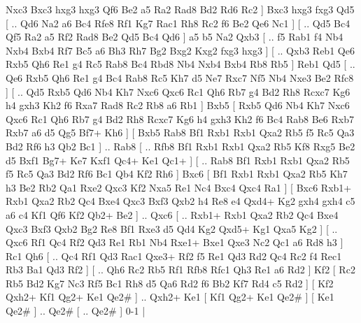 Nxc3  Bxc3 hxg3  hxg3 Qf6  Be2 a5  Ra2 Rad8  Bd2 Rd6  Rc2   ]  Bxc3   hxg3    fxg3   Qd5 [ .. Qd6  Na2 a6  Bc4 Rfe8  Rf1 Kg7  Rac1 Rh8  Rc2 f6  Be2 Qe6  Nc1   ]  [ .. Qd5  Bc4 Qf5  Ra2 a5  Rf2 Rad8  Be2 Qd5  Bc4 Qd6   ]  a5   b5    Na2   Qxb3 [ .. f5  Rab1 f4  Nb4 Nxb4  Bxb4 Rf7  Bc5 a6  Bh3 Rh7  Bg2 Bxg2  Kxg2 fxg3  hxg3   ]  [ .. Qxb3  Reb1 Qe6  Rxb5 Qh6  Re1 g4  Rc5 Rab8  Bc4 Rbd8  Nb4 Nxb4  Bxb4 Rb8  Rb5   ]  Reb1   Qd5 [ .. Qe6  Rxb5 Qh6  Re1 g4  Bc4 Rab8  Rc5 Kh7  d5 Ne7  Rxc7 Nf5  Nb4 Nxe3  Be2 Rfc8   ]  [ .. Qd5  Rxb5 Qd6  Nb4 Kh7  Nxc6 Qxc6  Rc1 Qh6  Rb7 g4  Bd2 Rh8  Rcxc7 Kg6  h4 gxh3  Kh2 f6  Rxa7 Rad8  Rc2 Rb8  a6 Rb1   ]  Bxb5 [  Rxb5 Qd6  Nb4 Kh7  Nxc6 Qxc6  Rc1 Qh6  Rb7 g4  Bd2 Rh8  Rcxc7 Kg6  h4 gxh3  Kh2 f6  Bc4 Rab8  Be6 Rxb7  Rxb7 a6  d5 Qg5  Bf7+ Kh6   ]  [  Bxb5 Rab8  Bf1 Rxb1  Rxb1 Qxa2  Rb5 f5  Rc5 Qa3  Bd2 Rf6  h3 Qb2  Bc1   ] .. Rab8 [ .. Rfb8  Bf1 Rxb1  Rxb1 Qxa2  Rb5 Kf8  Rxg5 Be2  d5 Bxf1  Bg7+ Ke7  Kxf1 Qc4+  Ke1 Qc1+   ]  [ .. Rab8  Bf1 Rxb1  Rxb1 Qxa2  Rb5 f5  Rc5 Qa3  Bd2 Rf6  Bc1 Qb4  Kf2 Rh6   ]  Bxc6 [  Bf1 Rxb1  Rxb1 Qxa2  Rb5 Kh7  h3 Be2  Rb2 Qa1  Rxe2 Qxc3  Kf2 Nxa5  Re1 Nc4  Bxc4 Qxc4  Ra1   ]  [  Bxc6 Rxb1+  Rxb1 Qxa2  Rb2 Qc4  Bxe4 Qxc3  Bxf3 Qxb2  h4 Re8  e4 Qxd4+  Kg2 gxh4  gxh4 c5  a6 c4  Kf1 Qf6  Kf2 Qb2+  Be2   ] .. Qxc6 [ .. Rxb1+  Rxb1 Qxa2  Rb2 Qc4  Bxe4 Qxc3  Bxf3 Qxb2  Bg2 Re8  Bf1 Rxe3  d5 Qd4  Kg2 Qxd5+  Kg1 Qxa5  Kg2   ]  [ .. Qxc6  Rf1 Qc4  Rf2 Qd3  Re1 Rb1  Nb4 Rxe1+  Bxe1 Qxe3  Nc2 Qc1  a6 Rd8  h3   ]  Rc1   Qh6 [ .. Qc4  Rf1 Qd3  Rac1 Qxe3+  Rf2 f5  Re1 Qd3  Rd2 Qc4  Rc2 f4  Rec1 Rb3  Ba1 Qd3  Rf2   ]  [ .. Qh6  Rc2 Rb5  Rf1 Rfb8  Rfc1 Qh3  Re1 a6  Rd2   ]  Kf2 [  Rc2 Rb5  Bd2 Kg7  Nc3 Rf5  Bc1 Rh8  d5 Qa6  Rd2 f6  Bb2 Kf7  Rd4 c5  Rd2   ]  [  Kf2 Qxh2+  Kf1 Qg2+  Ke1 Qe2#   ] .. Qxh2+    Ke1 [  Kf1 Qg2+  Ke1 Qe2#   ]  [  Ke1 Qe2#   ] .. Qe2#    [ .. Qe2#   ] 0-1  |
